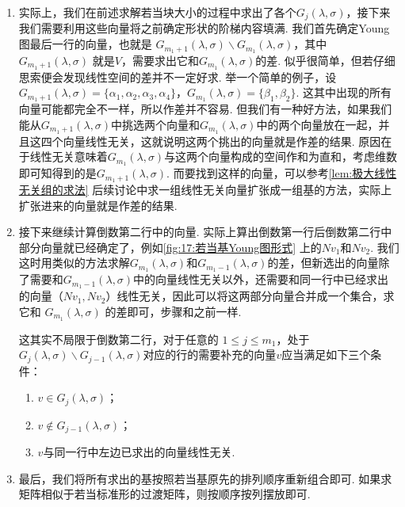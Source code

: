 \begin{enumerate}
    \item 实际上，我们在前述求解若当块大小的过程中求出了各个$G_j(\lambda,\sigma)$，接下来我们需要利用这些向量将之前确定形状的阶梯内容填满. 我们首先确定Young图最后一行的向量，也就是 $G_{m_1+1}(\lambda,\sigma) \backslash G_{m_1}(\lambda,\sigma)$，其中 $G_{m_1+1}(\lambda,\sigma)$ 就是$V$，需要求出它和$G_{m_1}(\lambda,\sigma)$的差. 似乎很简单，但若仔细思索便会发现线性空间的差并不一定好求. 举一个简单的例子，设$G_{m_1+1}(\lambda,\sigma)=\{\alpha_1,\alpha_2,\alpha_3,\alpha_4\}$，$G_{m_1}(\lambda,\sigma)=\{\beta_1,\beta_2\}$. 这其中出现的所有向量可能都完全不一样，所以作差并不容易. 但我们有一种好方法，如果我们能从$G_{m_1+1}(\lambda,\sigma)$中挑选两个向量和$G_{m_1}(\lambda,\sigma)$中的两个向量放在一起，并且这四个向量线性无关，这就说明这两个挑出的向量就是作差的结果. 原因在于线性无关意味着$G_{m_1}(\lambda,\sigma)$与这两个向量构成的空间作和为直和，考虑维数即可知得到的是$G_{m_1+1}(\lambda,\sigma)$. 而要找到这样的向量，可以参考\autoref{lem:极大线性无关组的求法} 后续讨论中求一组线性无关向量扩张成一组基的方法，实际上扩张进来的向量就是作差的结果.

    \item 接下来继续计算倒数第二行中的向量. 实际上算出倒数第一行后倒数第二行中部分向量就已经确定了，例如\autoref{fig:17:若当基Young图形式} 上的$Nv_1$和$Nv_2$. 我们这时用类似的方法求解$G_{m_1}(\lambda,\sigma)$和$G_{m_1-1}(\lambda,\sigma)$的差，但新选出的向量除了需要和$G_{m_1-1}(\lambda,\sigma)$中的向量线性无关以外，还需要和同一行中已经求出的向量（$Nv_1,Nv_2$）线性无关，因此可以将这两部分向量合并成一个集合，求它和 $G_{m_1}(\lambda,\sigma)$ 的差即可，步骤和之前一样.

          这其实不局限于倒数第二行，对于任意的 $1 \leqslant j \leqslant m_1$，处于$G_j(\lambda,\sigma)\backslash G_{j-1}(\lambda,\sigma)$对应的行的需要补充的向量$v$应当满足如下三个条件：
          \begin{enumerate}
              \item $v\in G_j(\lambda,\sigma)$；

              \item $v\notin G_{j-1}(\lambda,\sigma)$；

              \item $v$与同一行中左边已求出的向量线性无关.
          \end{enumerate}

    \item 最后，我们将所有求出的基按照若当基原先的排列顺序重新组合即可. 如果求矩阵相似于若当标准形的过渡矩阵，则按顺序按列摆放即可.
\end{enumerate}

